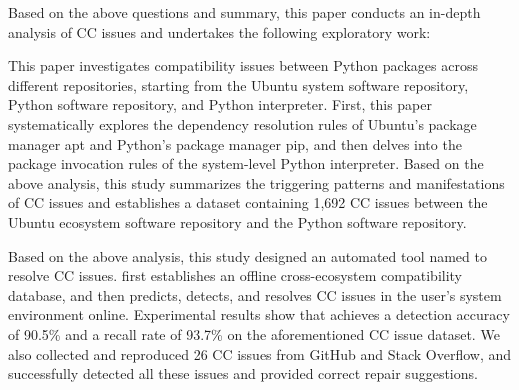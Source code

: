 \begin{eabstract}
Based on the above questions and summary, this paper conducts an in-depth analysis of CC issues and undertakes the following exploratory work:
\begin{compactitem}
	\item This paper investigates compatibility issues between Python packages across different repositories, starting from the Ubuntu system software repository, Python software repository, and Python interpreter.
	First, this paper systematically explores the dependency resolution rules of Ubuntu's package manager apt and Python's package manager pip, and then delves into the package invocation rules of the system-level Python interpreter.
	Based on the above analysis, this study summarizes the triggering patterns and manifestations of CC issues and establishes a dataset containing 1,692 CC issues between the Ubuntu ecosystem software repository and the Python software repository.
	\item Based on the above analysis, this study designed an automated tool named \tool{} to resolve CC issues.
	\tool{} first establishes an offline cross-ecosystem compatibility database, and then predicts, detects, and resolves CC issues in the user's system environment online.
	Experimental results show that \tool{} achieves a detection accuracy of 90.5\% and a recall rate of 93.7\% on the aforementioned CC issue dataset.
	We also collected and reproduced 26 CC issues from GitHub and Stack Overflow, and \tool{} successfully detected all these issues and provided correct repair suggestions.
\end{compactitem}


\end{eabstract}


